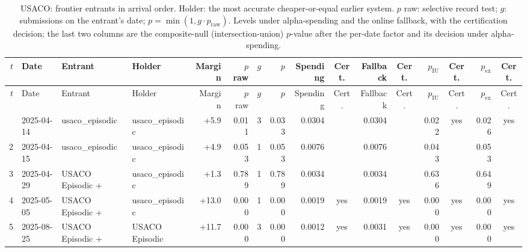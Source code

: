 {\begin{longtable}{rlllrrrrrcrcrcrc}
\caption{USACO: frontier entrants in arrival order. Holder: the most accurate cheaper-or-equal earlier system. $p$ raw: selective record test; $g$: submissions on the entrant's date; $p = \min(1, g \cdot p_{\mathrm{raw}})$. Levels under alpha-spending and the online fallback, with the certification decision; the last two columns are the composite-null (intersection-union) $p$-value after the per-date factor and its decision under alpha-spending.}\label{tab:supp-cert-hal_usaco}\\
\toprule
$t$ & Date & Entrant & Holder & Margin & $p$ raw & $g$ & $p$ & Spending & Cert. & Fallback & Cert. & $p_{\mathrm{IU}}$ & Cert. & $p_{\mathrm{ex}}$ & Cert. \\
\midrule
\endfirsthead
\toprule
$t$ & Date & Entrant & Holder & Margin & $p$ raw & $g$ & $p$ & Spending & Cert. & Fallback & Cert. & $p_{\mathrm{IU}}$ & Cert. & $p_{\mathrm{ex}}$ & Cert. \\
\midrule
\endhead
\bottomrule
\endfoot
1 & 2025-04-14 & usaco\_episodic & usaco\_episodic & +5.9 & 0.011 & 3 & 0.033 & 0.0304 &  & 0.0304 &  & 0.022 & yes & 0.026 & yes \\
2 & 2025-04-15 & usaco\_episodic & usaco\_episodic & +4.9 & 0.053 & 1 & 0.053 & 0.0076 &  & 0.0076 &  & 0.043 &  & 0.053 &  \\
3 & 2025-04-29 & USACO Episodic + ~ & usaco\_episodic & +1.3 & 0.789 & 1 & 0.789 & 0.0034 &  & 0.0034 &  & 0.636 &  & 0.649 &  \\
4 & 2025-05-05 & USACO Episodic + ~ & usaco\_episodic & +13.0 & 0.000 & 1 & 0.000 & 0.0019 & yes & 0.0019 & yes & 0.000 & yes & 0.000 & yes \\
5 & 2025-08-25 & USACO Episodic + ~ & USACO Episodic ~ & +11.7 & 0.000 & 3 & 0.000 & 0.0012 & yes & 0.0031 & yes & 0.000 & yes & 0.000 & yes \\
\end{longtable}
}
